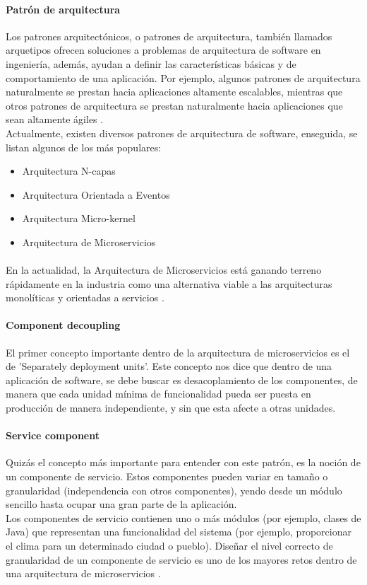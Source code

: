 \paragraph{Patrón de arquitectura}
Los patrones arquitectónicos, o patrones de arquitectura, también llamados arquetipos ofrecen soluciones a problemas de arquitectura de software en ingeniería, además, ayudan a definir las características básicas y de comportamiento de una aplicación. Por ejemplo, algunos patrones de arquitectura naturalmente se prestan hacia aplicaciones altamente escalables, mientras que otros patrones de arquitectura se prestan naturalmente hacia aplicaciones que sean altamente ágiles \citep{MarcoTeorico9}.
\\
Actualmente, existen diversos patrones de arquitectura de software, enseguida, se listan algunos de los más populares:
\begin{itemize}
	\item Arquitectura N-capas
	\item Arquitectura Orientada a Eventos
	\item Arquitectura Micro-kernel
	\item Arquitectura de Microservicios
\end{itemize}

\paragraph{}
En la actualidad, la Arquitectura de Microservicios está ganando terreno rápidamente en la industria como una alternativa viable a las arquitecturas monolíticas y orientadas a servicios \citep{MarcoTeorico9}.

\paragraph{Component decoupling}
El primer concepto importante dentro de la arquitectura de microservicios es el de 'Separately deployment units'. Este concepto nos dice que dentro de una aplicación de software, se debe buscar es desacoplamiento de los componentes, de manera que cada unidad mínima de funcionalidad pueda ser puesta en producción de manera independiente, y sin que esta afecte a otras unidades.

\paragraph{Service component} Quizás el concepto más importante para entender con este patrón, es la noción de un componente de servicio. Estos componentes pueden variar en tamaño o granularidad (independencia con otros componentes), yendo desde un módulo sencillo hasta ocupar una gran parte de la aplicación. 
\\
Los componentes de servicio contienen uno o más módulos (por ejemplo, clases de Java) que representan una funcionalidad del sistema (por ejemplo, proporcionar el clima para un determinado
ciudad o pueblo). Diseñar el nivel correcto de granularidad de un componente de servicio es uno de los mayores retos dentro de una arquitectura de microservicios \citep{MarcoTeorico9}.

